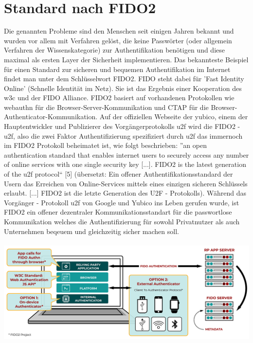 \section{Standard nach FIDO2}
Die genannten Probleme sind den Menschen seit einigen Jahren bekannt und wurden vor allem mit Verfahren gelöst, die keine Passwörter (oder allgemein Verfahren der Wissenskategorie) zur Authentifikation benötigen und diese maximal als ersten Layer der Sicherheit implementieren. Das bekannteste Beispiel für einen Standard zur sicheren und bequemen Authentifikation im Internet findet man unter dem Schlüsselwort FIDO2. FIDO steht dabei für 'Fast Identity Online' (Schnelle Identität im Netz). Sie ist das Ergebnis einer Kooperation des \ac{w3c} und der FIDO Alliance. FIDO2 basiert auf vorhandenen Protokollen wie \ac{webauthn} für die Browser-Server-Kommunikation und CTAP für die Browser-Authenticator-Kommunikation. Auf der offiziellen Webseite der yubico, einem der Hauptentwickler und Publizierer des Vorgängerprotokolls \ac{u2f} wird die FIDO2 - \ac{u2f}, also die zwei Faktor Authentifizierung spezifiziert durch \ac{u2f} das immernoch im FIDO2 Protokoll beheimatet ist, wie folgt beschrieben: ''an open authentication standard that enables internet users to securely access any number of online services with one single security key [...]. FIDO2 is the latest generation of the \ac{u2f} protocol`` [5] (übersetzt: Ein offener Authentifikationsstandard der Usern das Erreichen von Online-Services mittels eines einzigen sicheren Schlüssels erlaubt. [...] FIDO2 ist die letzte Generation des U2F - Protokolls). Während das Vorgänger - Protokoll \ac{u2f} von Google und Yubico ins Leben gerufen wurde, ist FIDO2 ein offener dezentraler Kommunikationsstandart für die passwortlose Kommunikation welches die Authentifizierung für sowohl Privatnutzer als auch Unternehmen beqeuem und gleichzeitig sicher machen soll. \\ \\
\includegraphics[width=15cm]{Graphics/FIDO2-Graphic-v2.png} \\
